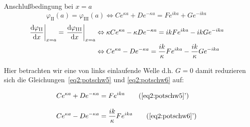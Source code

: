 Anschlußbedingung bei $x=a$
\begin{equation}
  \label{eq2:potschw5}
   \varphi_\textrm{II} (a) = \varphi_\textrm{III}(a)
   \Leftrightarrow  
  Ce^{\kappa a}+De^{-\kappa a} = Fe^{ika}+Ge^{-ika}
\end{equation}
\begin{align}
  \left.\frac{\text{d}\varphi_\textrm{II}}{\text{d}x}\right|_{x=a}
  =\left.\frac{\text{d}\varphi_\textrm{III}}{\text{d}x}\right|_{x=a}
  & \Leftrightarrow  
 \kappa Ce^{\kappa a}- \kappa D e^{-\kappa a} = ik Fe^{ika}-ik Ge^{-ika}  
 \label{eq2:potschw6}\\
  & \Leftrightarrow  
   Ce^{\kappa a}-De^{-\kappa a} = \frac{ik}{\kappa} Fe^{ika}
                      -\frac{ik}{\kappa} Ge^{-ika}\notag
\end{align}

Hier betrachten wir eine von links einlaufende Welle d.h. $G=0$ damit reduzieren
sich die Gleichungen~\eqref{eq2:potschw5} und \eqref{eq2:potschw6} auf:

\begin{align}
  &Ce^{\kappa a}+De^{-\kappa a} = Fe^{ika}
  \tag{\ref{eq2:potschw5}'}\label{eq2:potschw5'} \\[2ex]
  &Ce^{\kappa a}-De^{-\kappa a} = \frac{ik}{\kappa}
  Fe^{ika} \tag{\ref{eq2:potschw6}'}\label{eq2:potschw6'}
\end{align} 

